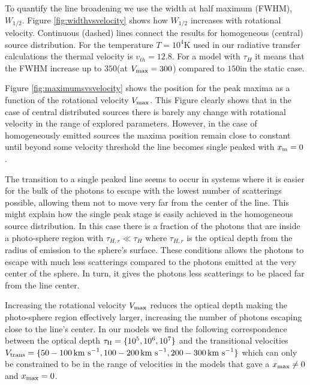 \documentclass{emulateapj}
\newcommand{\kms}{{\ifmmode{{\mathrm{\,km\ s}^{-1}}}\else{\,km~s$^{-1}$}\fi}}
\begin{document}
To quantify the line broadening we use the width at half maximum
(FWHM), $W_{1/2}$. Figure \ref{fig:widthvsvelocity} shows how $W_{1/2}$ increases
with rotational velocity. Continuous (dashed) lines connect the
results for homogeneous (central) source distribution. For the
temperature $T=10^4$K used in our radiative transfer calculations the
thermal velocity is $v_{th}=12.8$\kms. For a model with $\tau_{H}$ it
means that the FWHM increase up to $350$\kms (at $V_{\rm
  max}=300$\kms) compared to $150$\kms in the static case. 
 

Figure \ref{fig:maximumsvsvelocity} shows the position for the peak
maxima as a function of the rotational velocity $V_{\rm max}$. This
Figure clearly shows that in the case of central distributed
sources there is barely any change with rotational velocity in the
range of explored parameters. However, in the case of
homogeneously emitted sources the maxima position remain close to
constant until beyond some velocity threshold the line becomes single
peaked with $x_{\rm m}=0$ \kms. 

The transition to a single peaked line seems to occur in systems
where it is easier for the bulk of the photons to escape with the lowest
number of scatterings possible, allowing them not to move very far
from the center of the line. This might explain how the single peak stage
is easily achieved in the homogeneous source distribution. In this
case there is a fraction of the photons that are inside a photo-sphere
region with $\tau_{H,r}\ll \tau_{H}$ where $\tau_{H,r}$ is the optical
depth from the radius of emission to the sphere's surface. These
conditions allows the photons to escape with much less scatterings
compared to the photons emitted at the very center of the sphere. In
turn, it gives the photons less scatterings to be placed far from the
line center. 

Increasing the rotational velocity $V_{\rm max}$ reduces
the optical depth making the photo-sphere region effectively larger,
increasing the number of photons escaping close to the line's
center. In our models we find the following correspondence between the
optical depth $\tau_{\rm H}=\{10^5, 10^6, 10^7\}$ and the transitional
velocities $V_{\rm   trans}=\{50-100\kms, 100-200\kms, 200-300\kms\}$
which can only be constrained to be in the range of velocities in the
models that gave a $x_{\rm max}\neq 0$ and $x_{\rm max}=0$.  
\end{document}
